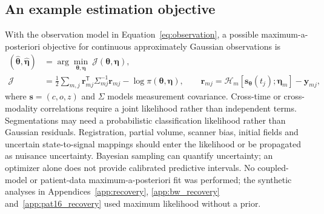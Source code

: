 \subsection{An example estimation objective}
With the observation model in Equation~\eqref{eq:observation}, a possible maximum-a-posteriori objective for continuous approximately Gaussian observations is
\begin{align}
 (\widehat{\bm\theta},\widehat{\bm\eta})
 &=\arg\min_{\bm\theta,\bm\eta}\ \mathcal J(\bm\theta,\bm\eta),\\
 \mathcal J&=\frac12\sum_{m,j}\bm r_{mj}^{\mathsf T}\Sigma_{mj}^{-1}\bm r_{mj}
 -\log\pi(\bm\theta,\bm\eta),\qquad
 \bm r_{mj}=\mathcal H_m[\bm s_{\bm\theta}(t_j);\bm\eta_m]-\bm y_{mj},
\end{align}
where $\bm s=(c,o,z)$ and $\Sigma$ models measurement covariance. Cross-time or cross-modality correlations require a joint likelihood rather than independent terms. Segmentations may need a probabilistic classification likelihood rather than Gaussian residuals. Registration, partial volume, scanner bias, initial fields and uncertain state-to-signal mappings should enter the likelihood or be propagated as nuisance uncertainty. Bayesian sampling can quantify uncertainty; an optimizer alone does not provide calibrated predictive intervals. No coupled-model or patient-data maximum-a-posteriori fit was performed; the synthetic analyses in Appendices~\ref{app:recovery}, \ref{app:bw_recovery} and~\ref{app:pat16_recovery} used maximum likelihood without a prior.

